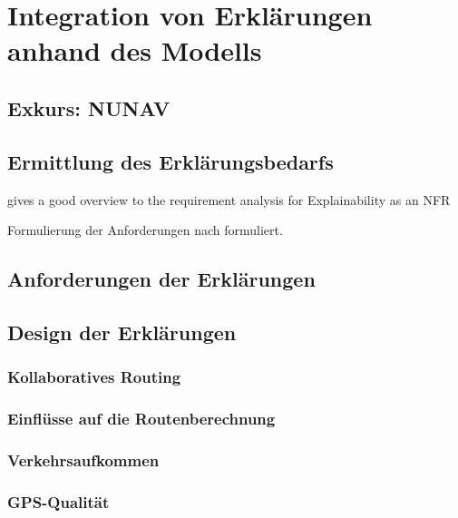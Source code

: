 \section{Integration von Erklärungen anhand des Modells}

\subsection{Exkurs: NUNAV}

\subsection{Ermittlung des Erklärungsbedarfs}

\cite{golledge1999wayfinding}

\cite{bovy2012route}

\cite{kohl_explainability_2019} gives a good overview to the requirement analysis for Explainability as an NFR

Formulierung der Anforderungen nach \cite{rajnish2010quality, wiegers1999writing, alexander2002writing} formuliert.

\subsection{Anforderungen der Erklärungen}

\subsection{Design der Erklärungen}

\subsubsection{Kollaboratives Routing}
\label{sec:user_count_definition}

\subsubsection{Einflüsse auf die Routenberechnung}
\label{sec:route_explanation_definition}

\subsubsection{Verkehrsaufkommen}
\label{sec:traffic_volume_definition}

\subsubsection{GPS-Qualität}
\label{sec:gps_accuracy_definition}

